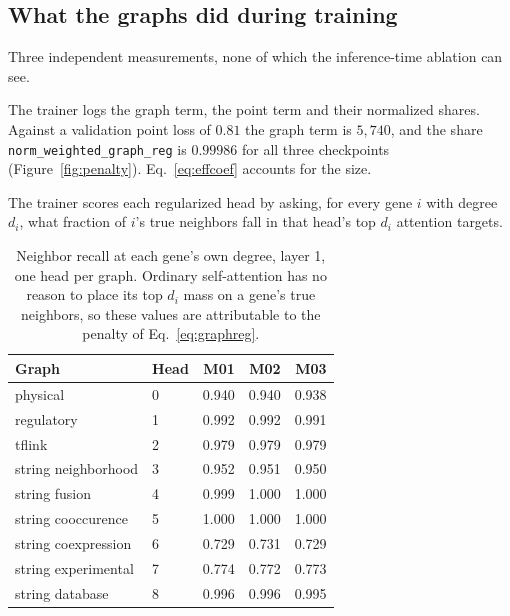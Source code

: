 \subsection{What the graphs did during training}
\label{sec:graphablation}

Three independent measurements, none of which the inference-time ablation can see.

The trainer logs the graph term, the point term and their normalized shares.
Against a validation point loss of $0.81$ the graph term is $5{,}740$, and the
share \texttt{norm\_weighted\_graph\_reg} is $0.99986$ for all three checkpoints
(Figure~\ref{fig:penalty}). Eq.~\ref{eq:effcoef} accounts for the size.

The trainer scores each regularized head by asking, for every gene $i$ with degree
$d_i$, what fraction of $i$'s true neighbors fall in that head's top $d_i$ attention
targets.

\begin{table}[htbp]
\centering
\footnotesize
\caption{Neighbor recall at each gene's own degree, layer 1, one head per graph.
Ordinary self-attention has no reason to place its top $d_i$ mass on a gene's true
neighbors, so these values are attributable to the penalty of
Eq.~\ref{eq:graphreg}.}
\label{tab:edgerecovery}
\begin{tabular}{llrrr}
\toprule
Graph & Head & M01 & M02 & M03 \\
\midrule
physical & 0 & 0.940 & 0.940 & 0.938 \\
regulatory & 1 & 0.992 & 0.992 & 0.991 \\
tflink & 2 & 0.979 & 0.979 & 0.979 \\
string neighborhood & 3 & 0.952 & 0.951 & 0.950 \\
string fusion & 4 & 0.999 & 1.000 & 1.000 \\
string cooccurence & 5 & 1.000 & 1.000 & 1.000 \\
string coexpression & 6 & 0.729 & 0.731 & 0.729 \\
string experimental & 7 & 0.774 & 0.772 & 0.773 \\
string database & 8 & 0.996 & 0.996 & 0.995 \\
\bottomrule
\end{tabular}
\end{table}

